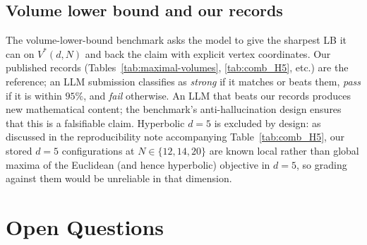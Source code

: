 \documentclass[11pt]{article}
\begin{document}
\subsection{Volume lower bound and our records}

The volume-lower-bound benchmark asks the model to give the sharpest
LB it can on $V^*(d, N)$ and back the claim with explicit vertex
coordinates.  Our published records (Tables~\ref{tab:maximal-volumes},
\ref{tab:comb_H5}, etc.) are the reference; an LLM submission
classifies as \emph{strong} if it matches or beats them, \emph{pass}
if it is within $95\%$, and \emph{fail} otherwise.  An LLM that
beats our records produces new mathematical content; the
benchmark's anti-hallucination design ensures that this is a
falsifiable claim.  Hyperbolic $d = 5$ is excluded by design: as
discussed in the reproducibility note accompanying
Table~\ref{tab:comb_H5}, our stored $d = 5$ configurations at
$N \in \{12, 14, 20\}$ are known local rather than global maxima
of the Euclidean (and hence hyperbolic) objective in $d = 5$, so
grading against them would be unreliable in that dimension.

\section{Open Questions}
\end{document}
